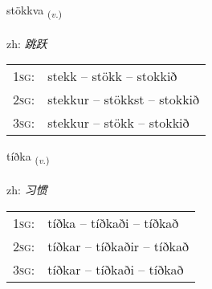 \documentclass[frontgrid, backgrid]{flacards}\usepackage[]{graphicx}\usepackage[]{color}
\begin{document}
\renewcommand{\flhead}{\vskip5pt \fboxsep=0pt {\small\bfseries\footnotesize Sagnorð | 动词}}
\renewcommand{\fcfoot}{\vskip5pt \fboxsep=0pt \hspace{2pt}{\small\bfseries\footnotesize 2K}}

\renewcommand{\blhead}{\vskip5pt {\small\bfseries\footnotesize Sagnorð | 动词 }}
\renewcommand{\bcfoot}{\vskip5pt \hspace{2pt}{\small\bfseries\footnotesize 2K}}


{stökkva \small{\textsubscript{(\textit{v.})}} \\[1ex] %
\textphonetic{[stœhkva]} \\
zh: \emph{跳跃} \\  [2ex]
\renewcommand*{\arraystretch}{0.8}
\begin{tabular}{p{1cm}l}
\textsc{1sg}: & stekk -- stökk -- stokkið \\ 
\textsc{2sg}: & stekkur -- stökkst -- stokkið \\ 
\textsc{3sg}: & stekkur -- stökk -- stokkið \\ 
\end{tabular}
}

\renewcommand{\flhead}{\vskip5pt \fboxsep=0pt {\small\bfseries\footnotesize Sagnorð | 动词}}
\renewcommand{\fcfoot}{\vskip5pt \fboxsep=0pt \hspace{2pt}{\small\bfseries\footnotesize 2K}}

\renewcommand{\blhead}{\vskip5pt {\small\bfseries\footnotesize Sagnorð | 动词 }}
\renewcommand{\bcfoot}{\vskip5pt \hspace{2pt}{\small\bfseries\footnotesize 2K}}


{tíðka \small{\textsubscript{(\textit{v.})}} \\[1ex] %
\textphonetic{[tʰiθka]} \\
zh: \emph{习惯} \\  [2ex]
\renewcommand*{\arraystretch}{0.8}
\begin{tabular}{p{1cm}l}
\textsc{1sg}: & tíðka -- tíðkaði -- tíðkað \\ 
\textsc{2sg}: & tíðkar -- tíðkaðir -- tíðkað \\ 
\textsc{3sg}: & tíðkar -- tíðkaði -- tíðkað \\ 
\end{tabular}
}
\end{document}

